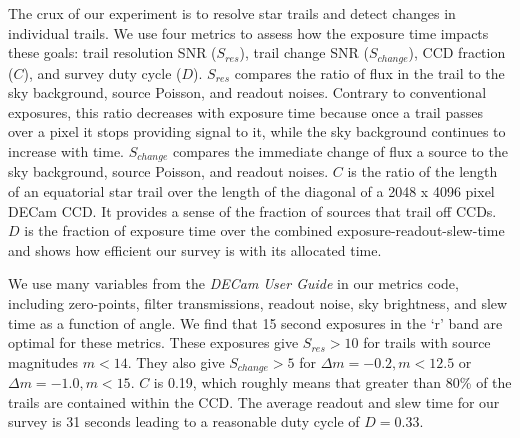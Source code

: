 \documentclass[11pt]{article}
\begin{document}


%

\technicaldescription

The crux of our experiment is to resolve star trails and detect changes in individual trails. We use four metrics to assess how the exposure time impacts these goals: trail resolution SNR ($S_{res}$), trail change SNR ($S_{change}$), CCD fraction ($C$), and survey duty cycle ($D$). $S_{res}$ compares the ratio of flux in the trail to the sky background, source Poisson, and readout noises. Contrary to conventional exposures, this ratio decreases with exposure time because once a trail passes over a pixel it stops providing signal to it, while the sky background continues to increase with time. $S_{change}$ compares the immediate change of flux a source to the sky background, source Poisson, and readout noises. $C$ is the ratio of the length of an equatorial star trail over the length of the diagonal of a 2048 x 4096 pixel DECam CCD. It provides a sense of the fraction of sources that trail off CCDs. $D$ is the fraction of exposure time over the combined exposure-readout-slew-time and shows how efficient our survey is with its allocated time.

We use many variables from the \textit{DECam User Guide} in our metrics code, including zero-points, filter transmissions, readout noise, sky brightness, and slew time as a function of angle. We find that 15 second exposures in the `r' band are optimal for these metrics. These exposures give $S_{res} > 10$ for trails with source magnitudes $m < 14$. They also give $S_{change} > 5$ for $\Delta m = -0.2, m < 12.5$ or $\Delta m = -1.0, m < 15$. $C$ is 0.19, which roughly means that greater than 80\% of the trails are contained within the CCD. The average readout and slew time for our survey is 31 seconds leading to a reasonable duty cycle of $D = 0.33$.
\end{document}
